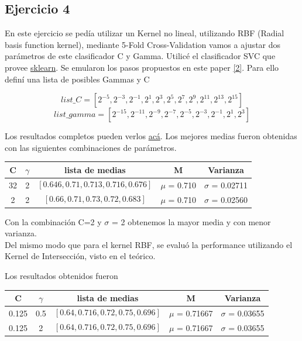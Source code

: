 \documentclass[11pt, spanish, a4paper]{article}
\begin{document}
\subsection{Ejercicio 4}
\label{ejercicio4}
En este ejercicio se pedía utilizar un Kernel no lineal, utilizando RBF (Radial basis function kernel), mediante 5-Fold Cross-Validation vamos a ajustar dos parámetros de este clasificador C y Gamma.
Utilicé el clasificador SVC que provee \href{http://scikit-learn.org/stable/modules/generated/sklearn.svm.SVC.html}{sklearn}. Se emularon los pasos propuestos en este paper \hyperref[link:2]{[2]}.
Para ello definí una lista de posibles Gammas y C

$$list\_C = [2^{-5},2^{-3},2^{-1},2^{1},2^3,2^5,2^7,2^9,2^{11},2^{13},2^{15}]$$
$$list\_gamma = [2^{-15},2^{-11},2^{-9},2^{-7},2^{-5},2^{-3},2^{-1},2^1,2^3]$$

Los resultados completos pueden verlos \href{https://docs.google.com/document/d/1vSQzkjXlh4S2QZz5wHdIaTj6m-YVoP2cGT63onHjL80/}{acá}. Los mejores medias fueron obtenidas con las siguientes combinaciones de parámetros.

\begin{center}
	\begin{tabular}{|c|c|c|c|c|}
	\hline
	\textbf{C} & \textbf{\(\gamma\)} & \textbf{lista de medias} & M & Varianza \\ \hline
	32 & 2 & $$[0.646, 0.71, 0.713, 0.716, 0.676]$$ & \(\mu\) = 0.710 & \(\sigma\) = 0.02711 \\ \hline
	2 & 2 & $$[0.66, 0.71, 0.73, 0.72, 0.683]$$ & \(\mu\) = 0.710 &  \(\sigma\) = 0.02560 \\ \hline
	\end{tabular}
\end{center}

Con la combinación C=2 y \(\sigma\) = 2 obtenemos la mayor media y con menor varianza. \\

Del mismo modo que para el kernel RBF, se evaluó la performance utilizando el Kernel de Intersección, visto en el teórico.

Los resultados obtenidos fueron

\begin{center}
	\begin{tabular}{|c|c|c|c|c|}
	\hline
	\textbf{C} & \textbf{\(\gamma\)} & \textbf{lista de medias} & M & Varianza \\ \hline
	0.125 & 0.5 & $$[0.64, 0.716, 0.72, 0.75, 0.696]$$ & \(\mu\) = 0.71667 & \(\sigma\) = 0.03655 \\ \hline
	0.125 & 2 & $$[0.64, 0.716, 0.72, 0.75, 0.696]$$ & \(\mu\) = 0.71667 &  \(\sigma\) = 0.03655 \\ \hline
	\end{tabular}
\end{center}
\end{document}
